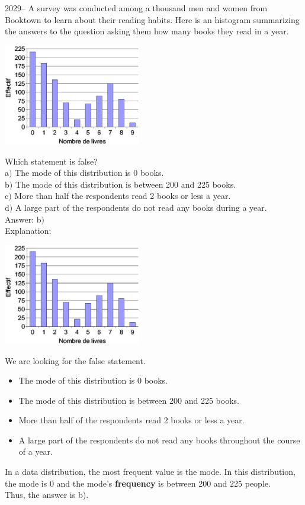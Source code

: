 \documentclass[letterpaper, 12pt]{article}
\begin{document}
2029-- A survey was conducted among a thousand men and women from
Booktown to learn about their reading habits. Here is an histogram
summarizing the answers to the question asking them how many books
they read in a year.
\begin{center}
 \includegraphics[width=6cm]{GraphLivreEPS.eps}
\end{center}

Which statement is false?\\

a$)$ The mode of this distribution is 0 books.\\
b$)$ The mode of this distribution is between 200 and 225 books.\\
c$)$ More than half the respondents read 2 books or less a year.\\
d$)$ A large part of the respondents do not read any books during a year.\\

Answer: b$)$\\

Explanation:
\begin{center}
 \includegraphics[width=6cm]{GraphLivreEPS.eps}
\end{center}
We are looking for the false statement.\\
\begin{itemize}
 \item The mode of this distribution is 0 books.
 \item The mode of this distribution is between 200 and 225 books.
 \item More than half of the respondents read 2 books or less a year.
 \item A large part of the respondents do not read any books throughout the course of a year.\\
\end{itemize}
In a data distribution, the most frequent value is the mode. In this distribution, the mode is 0 and the mode's \textbf{frequency} is between 200 and 225 people.  \\
Thus, the answer is b).\\
\end{document}
